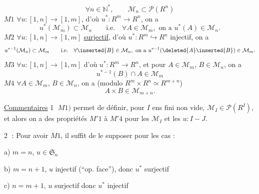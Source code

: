 \[
\forall n\in\mathbb N^*,\qquad\mathcal M_n\subset\mathcal P(R^n)
\]
\textcircled{\scriptsize$M1$} $\forall u:[1,n]\longrightarrow[1,m]$, d'où $u^*:R^m\longrightarrow R^n$, on a
\[
u^*(\mathcal M_m)\subset\mathcal M_n\qquad\text{i.e.}\quad\forall A\in\mathcal M_m,\text{ on a }u^*(A)\in\mathcal M_n.
\]
\textcircled{\scriptsize$M2$} $\forall u:[1,n]\longrightarrow[1,m]$ \uline{surjectif}, d'où $u^*:R^m\hookrightarrow R^n$ injectif, on a
\[
u^{*-1}(\mathcal M_n)\subset\mathcal M_m\qquad\text{i.e.}\quad\forall \inserted{B}\in\mathcal M_n,\text{ on a }u^{*-1}(\deleted{A}\inserted{B})\in\mathcal M_m.
\]
\textcircled{\scriptsize$M3$} $\forall u:[1,n]\longrightarrow[1,m]$ d'où $u^*:R^m\longrightarrow R^n$, et pour $A\in\mathcal M_m$, $B\in\mathcal M_n$, on a
\[
u^{*-1}(B)\cap A\in\mathcal M_m
\]
\textcircled{\scriptsize$M4$} $\forall A\in\mathcal M_m$, $B\in\mathcal M_n$, on a (modulo $R^m\times R^n\simeq R^{m+n}$)
\[
A\times B\in\mathcal M_{m+n}.
\]

\uline{Commentaires} \textcircled{1} $M1)$ permet de définir, pour  $I$ ens fini non vide, $\mathcal M_I\in\mathcal P(R^I)$, et alors on a des propriétés $M'1$ à $M'4$ pour les $\mathcal M_I$ et les $u:I\mathbin{-}J$.

\textcircled{2} : Pour avoir $M1$, il suffit de le supposer pour les  cas :

a) $m=n$, $u\in\mathfrak S_n$

b) $m=n+1$, $u$ injectif (``op. face''), donc $u^*$ surjectif

c) $n=m+1$, $u$ surjectif   donc $u^*$ injectif



